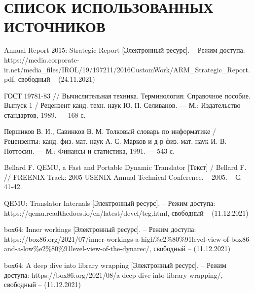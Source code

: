 \section*{СПИСОК ИСПОЛЬЗОВАННЫХ ИСТОЧНИКОВ}

\begingroup
\renewcommand{\section}[2]{}
\begin{thebibliography}{}
	Annual Report 2015: Strategic Report [Электронный ресурс]. – Режим доступа: https://media.corporate-ir.net/media\_files/IROL/19/197211/2016CustomWork/ARM\_Strategic\_Report.pdf,
	свободный – (24.11.2021)
		
	 ГОСТ 19781-83 // Вычислительная техника. Терминология: Справочное пособие. Выпуск 1 / Рецензент канд. техн. наук Ю. П. Селиванов. — М.: Издательство стандартов, 1989. — 168 с.
	 
	  Першиков В. И., Савинков В. М. Толковый словарь по информатике / Рецензенты: канд. физ.-мат. наук А. С. Марков и д-р физ.-мат. наук И. В. Поттосин. — М.: Финансы и статистика, 1991. — 543 с.
	
	Bellard F. QEMU, a Fast and Portable Dynamic Translator [Текст]  / Bellard F. // FREENIX Track: 2005 USENIX Annual Technical Conference. – 2005. – С. 41-42.
	
QEMU: Translator Internals [Электронный ресурс]. – Режим доступа: https://qemu.readthedocs.io/en/latest/devel/tcg.html,
свободный – (11.12.2021)

box64: Inner workings [Электронный ресурс]. – Режим доступа: https://box86.org/2021/07/inner-workings-a-high\%e2\%80\%91level-view-of-box86-and-a-low\%e2\%80\%91level-view-of-the-dynarec/,
свободный – (11.12.2021)

box64: A deep dive into library wrapping [Электронный ресурс]. – Режим доступа: https://box86.org/2021/08/a-deep-dive-into-library-wrapping/,
свободный – (11.12.2021)
\end{thebibliography}
\endgroup

\pagebreak